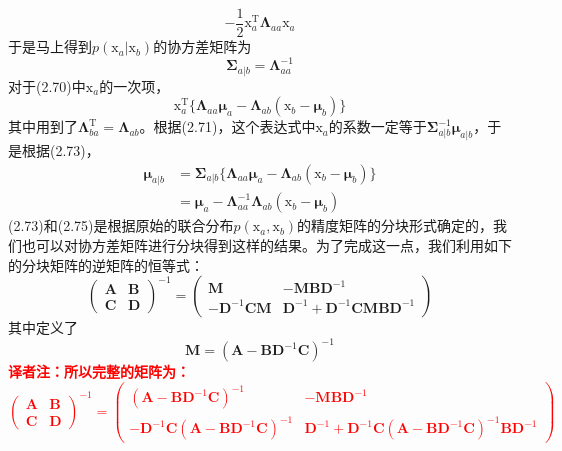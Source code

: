 \documentclass[b5paper]{book}
\numberwithin{equation}{chapter}
\newcommand {\bx} {\boldsymbol{\mathrm{x}}}
\newcommand {\rmT} {\mathrm{T}}
\newcommand {\bfMu} {\boldsymbol{\mu}}
\newcommand {\bfSigma} {\boldsymbol{\Sigma}}
\newcommand {\bfLambda} {\boldsymbol{\Lambda}}
\begin{document}
{	\begin{equation}
		-\frac{1}{2}\bx_a^{\rmT}\bfLambda_{aa}\bx_a
	\end{equation}
	于是马上得到$p(\bx_a|\bx_b)$的协方差矩阵为
	\begin{equation}
		\bfSigma_{a|b}=\bfLambda_{aa}^{-1}
	\end{equation}
	对于(2.70)中$\bx_a$的一次项，
	\begin{equation}
		\bx_a^{\rmT}\{\bfLambda_{aa}\bfMu_a - \bfLambda_{ab}(\bx_b-\bfMu_b)\}
	\end{equation}
	其中用到了$\bfLambda_{ba}^{\rmT}=\bfLambda_{ab}$。根据(2.71)，这个表达式中$\bx_a$的系数一定等于$\bfSigma_{a|b}^{-1}\bfMu_{a|b}$，于是根据(2.73)，
	\begin{equation}
	\begin{split}
		\bfMu_{a|b} &= \bfSigma_{a|b}\{\bfLambda_{aa}\bfMu_a-\bfLambda_{ab}(\bx_b-\bfMu_b)\} \\
		&= \bfMu_a-\bfLambda_{aa}^{-1}\bfLambda_{ab}(\bx_b-\bfMu_b)
	\end{split}
	\end{equation}
	\indent (2.73)和(2.75)是根据原始的联合分布$p(\bx_a,\bx_b)$的精度矩阵的分块形式确定的，我们也可以对协方差矩阵进行分块得到这样的结果。为了完成这一点，我们利用如下的分块矩阵的逆矩阵的恒等式：
	\begin{equation}
		\left(\begin{matrix}\mathbf{A} & \mathbf{B} \\ \mathbf{C} & \mathbf{D} \end{matrix}\right)^{-1}=\left(\begin{matrix}\mathbf{M} & -\mathbf{MBD}^{-1} \\ -\mathbf{D}^{-1}\mathbf{CM} & \mathbf{D}^{-1}+\mathbf{D}^{-1}\mathbf{CMBD}^{-1}\end{matrix}\right)
	\end{equation}
	其中定义了
	\begin{equation}
		\mathbf{M}=(\mathbf{A}-\mathbf{BD}^{-1}\mathbf{C})^{-1}
	\end{equation}
	\textcolor{red}{\textbf{译者注：所以完整的矩阵为：}
	\[
		\left(\begin{matrix}\mathbf{A} & \mathbf{B} \\ \mathbf{C} & \mathbf{D} \end{matrix}\right)^{-1}=\left(\begin{matrix}(\mathbf{A}-\mathbf{BD}^{-1}\mathbf{C})^{-1} & -\mathbf{MBD}^{-1} \\ -\mathbf{D}^{-1}\mathbf{C}(\mathbf{A}-\mathbf{BD}^{-1}\mathbf{C})^{-1} & \mathbf{D}^{-1}+\mathbf{D}^{-1}\mathbf{C}(\mathbf{A}-\mathbf{BD}^{-1}\mathbf{C})^{-1}\mathbf{BD}^{-1}\end{matrix}\right)
\]}}
\end{document}

